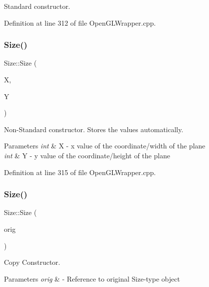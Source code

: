 Standard constructor. 



Definition at line 312 of file Open\+G\+L\+Wrapper.\+cpp.

\mbox{\label{classSize_a5786d8c0ac663667879ce1a9663afbd2}} 
\subsubsection{\texorpdfstring{Size()}{Size()}\hspace{0.1cm}{\footnotesize\ttfamily [2/3]}}
{\footnotesize\ttfamily Size\+::\+Size (\begin{DoxyParamCaption}\item[{int}]{X,  }\item[{int}]{Y }\end{DoxyParamCaption})}



Non-\/\+Standard constructor. Stores the values automatically. 


\begin{DoxyParams}{Parameters}
{\em int} & X -\/ x value of the coordinate/width of the plane \\
\hline
{\em int} & Y -\/ y value of the coordinate/height of the plane \\
\hline
\end{DoxyParams}


Definition at line 315 of file Open\+G\+L\+Wrapper.\+cpp.

\mbox{\label{classSize_a34fcd67adeb20dfb42150d701060912f}} 
\subsubsection{\texorpdfstring{Size()}{Size()}\hspace{0.1cm}{\footnotesize\ttfamily [3/3]}}
{\footnotesize\ttfamily Size\+::\+Size (\begin{DoxyParamCaption}\item[{const \mbox{\hyperlink{classSize}{Size}} \&}]{orig }\end{DoxyParamCaption})}



Copy Constructor. 


\begin{DoxyParams}{Parameters}
{\em orig} & -\/ Reference to original Size-\/type object \\
\hline
\end{DoxyParams}


